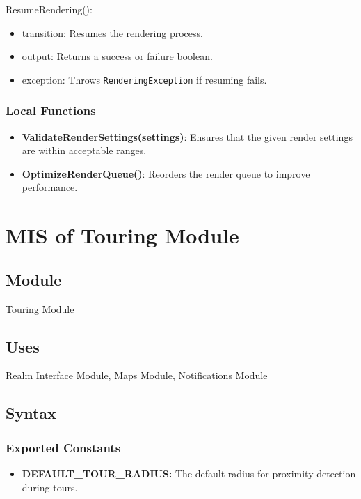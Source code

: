 \documentclass[12pt, titlepage]{article}
\begin{document}
\noindent ResumeRendering():
\begin{itemize}
    \item transition: Resumes the rendering process.
    \item output: Returns a success or failure boolean.
    \item exception: Throws \texttt{RenderingException} if resuming fails.
\end{itemize}

\subsubsection{Local Functions}

\begin{itemize}
    \item \textbf{ValidateRenderSettings(settings)}: Ensures that the given render settings are within acceptable ranges.
    \item \textbf{OptimizeRenderQueue()}: Reorders the render queue to improve performance.
\end{itemize}

\newpage

\section{MIS of Touring Module} \label{TouringModule}

\subsection{Module}

Touring Module

\subsection{Uses}

Realm Interface Module, Maps Module, Notifications Module

\subsection{Syntax}

\subsubsection{Exported Constants}

\begin{itemize}
    \item \textbf{DEFAULT\_TOUR\_RADIUS:} The default radius for proximity detection during tours.
\end{itemize}
\end{document}
